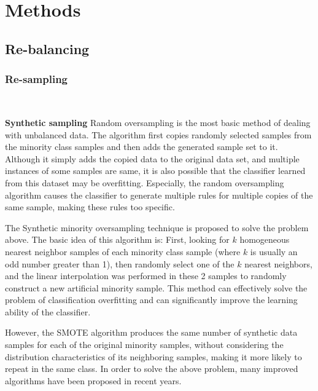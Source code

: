 \section{Methods}
\label{sec:methods}

\subsection{Re-balancing}


\subsubsection{Re-sampling}\

\textbf{Synthetic sampling} Random oversampling is the most basic method of dealing with unbalanced data. The algorithm first copies randomly selected samples from the minority class samples and then adds the generated sample set to it. Although it simply adds the copied data to the original data set, and multiple instances of some samples are same, it is also possible that the classifier learned from this dataset may be overfitting. Especially, the random oversampling algorithm causes the classifier to generate multiple rules for multiple copies of the same sample, making these rules too specific.

The Synthetic minority oversampling technique is proposed to solve the problem above. The basic idea of this algorithm is: First, looking for $k$ homogeneous nearest neighbor samples of each minority class sample (where $k$ is usually an odd number greater than 1), then randomly select one of the $k$ nearest neighbors, and the linear interpolation was performed in these 2 samples to randomly construct a new artificial minority sample. This method can effectively solve the problem of classification overfitting and can significantly improve the learning ability of the classifier. 

However, the SMOTE algorithm \cite{ref_2} produces the same number of synthetic data samples for each of the original minority samples, without considering the distribution characteristics of its neighboring samples, making it more likely to repeat in the same class. In order to solve the above problem, many improved algorithms have been proposed in recent years. 

